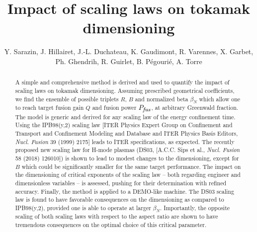 \documentclass[12pt]{iopart}
\newcommand{\Pfus}{{P_{\textrm{\it\footnotesize fus}}}}
\newcommand{\newstuff}[1]{\color{blue}{#1}\color{black}}
\begin{document}
\title{Impact of scaling laws on tokamak \newstuff{reactor } dimensioning}

\author{Y. Sarazin, J. Hillairet, J.-L. Duchateau, K. Gaudimont, R. Varennes, X. Garbet, Ph. Ghendrih, R. Guirlet, B. P\'egouri\'e, A. Torre}

\address{CEA, IRFM, Saint-Paul-lez-Durance, F-13108, France.}
\vspace{10pt}
\begin{indented}
\item[\today]
\end{indented}

\begin{abstract}
A simple and comprehensive method is derived and used to quantify the impact of scaling laws on tokamak dimensioning. Assuming prescribed geometrical coefficients, we find the ensemble of possible triplets $R$, $B$ and normalized beta $\beta_N$ which allow one to reach target fusion gain $Q$ and fusion power $\Pfus$, at arbitrary Greenwald fraction. The model is generic and derived for any scaling law of the energy confinement time. Using the IPB98(y,2) scaling law [ITER Physics Expert Group on Confinement and Transport and Confinement Modeling and Database and ITER Physics Basis Editors, \emph{Nucl. Fusion} 39 (1999) 2175] leads to ITER specifications, as expected. The recently proposed new scaling law for H-mode plasmas (DS03, [A.C.C. Sips et al., \emph{Nucl. Fusion} 58 (2018) 126010]) is shown to lead to modest changes to the dimensioning, except for $B$ which could be significantly smaller for the same target performance. The impact on the dimensioning of critical exponents of the scaling law -- both regarding engineer and dimensionless variables -- is assessed, pushing for their determination with refined accuracy. Finally, the method is applied to a DEMO-like machine. The DS03 scaling law is found to have favorable consequences on the dimensioning as compared to IPB98(y,2), provided one is able to operate at larger $\beta_N$. Importantly, the opposite scaling of both scaling laws with respect to the aspect ratio are shown to have tremendous consequences on the optimal choice of this critical parameter. 
\end{abstract}

%
%
\submitto{\NF}
% 
%
\end{document}
